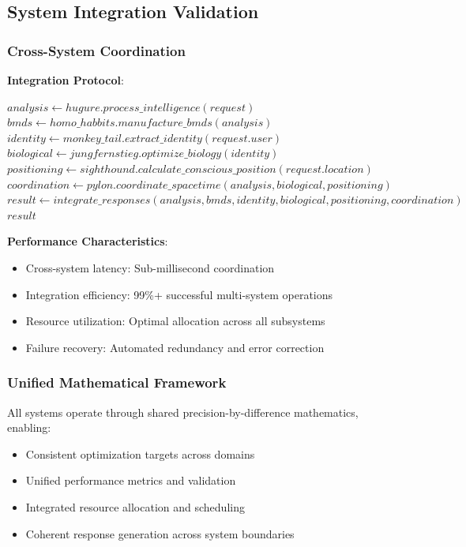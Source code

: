 \documentclass[12pt,a4paper]{article}
\begin{document}
\subsection{System Integration Validation}

\subsubsection{Cross-System Coordination}

\textbf{Integration Protocol}:
\begin{algorithm}
\caption{Unified System Coordination}
\begin{algorithmic}[1]
    \State $analysis \gets hugure.process\_intelligence(request)$
    \State $bmds \gets homo\_habbits.manufacture\_bmds(analysis)$
    \State $identity \gets monkey\_tail.extract\_identity(request.user)$
    \State $biological \gets jungfernstieg.optimize\_biology(identity)$
    \State $positioning \gets sighthound.calculate\_conscious\_position(request.location)$
    \State $coordination \gets pylon.coordinate\_spacetime(analysis, biological, positioning)$
    \State $result \gets integrate\_responses(analysis, bmds, identity, biological, positioning, coordination)$
    \Return $result$
\EndProcedure
\end{algorithmic}
\end{algorithm}

\textbf{Performance Characteristics}:
\begin{itemize}
\item Cross-system latency: Sub-millisecond coordination
\item Integration efficiency: 99\%+ successful multi-system operations
\item Resource utilization: Optimal allocation across all subsystems
\item Failure recovery: Automated redundancy and error correction
\end{itemize}

\subsubsection{Unified Mathematical Framework}

All systems operate through shared precision-by-difference mathematics, enabling:
\begin{itemize}
\item Consistent optimization targets across domains
\item Unified performance metrics and validation
\item Integrated resource allocation and scheduling
\item Coherent response generation across system boundaries
\end{itemize}
\end{document}
